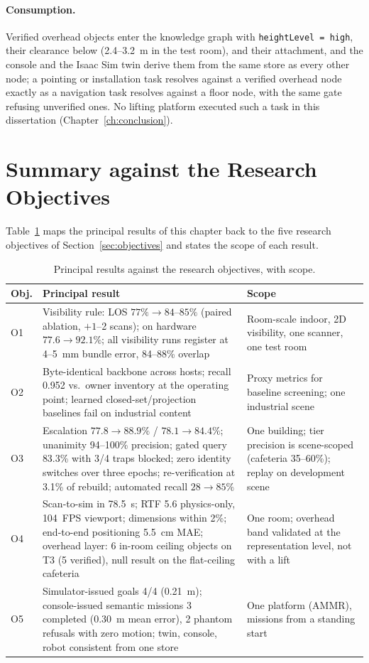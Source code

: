 \paragraph{Consumption.}
Verified overhead objects enter the knowledge graph with
\texttt{heightLevel = high}, their clearance below (2.4--3.2~m in the test
room), and their attachment, and the console and the Isaac Sim twin derive
them from the same store as every other node; a pointing or installation
task resolves against a verified overhead node exactly as a navigation task
resolves against a floor node, with the same gate refusing unverified ones.
No lifting platform executed such a task in this dissertation
(Chapter~\ref{ch:conclusion}).

\section{Summary against the Research Objectives}
\label{sec:exp-summary}

Table~\ref{tab:objsummary} maps the principal results of this chapter back to
the five research objectives of Section~\ref{sec:objectives} and states the
scope of each result.

\begin{table}[htbp]
\centering
\caption{Principal results against the research objectives, with scope.}
\label{tab:objsummary}
\small
\begin{tabularx}{\textwidth}{l X X}
\toprule
\textbf{Obj.} & \textbf{Principal result} & \textbf{Scope} \\
\midrule
O1 & Visibility rule: LOS $77\%\to84$--$85\%$ (paired ablation, $+1$--2 scans); on hardware $77.6\to92.1\%$; all visibility runs register at 4--5~mm bundle error, 84--88\% overlap & Room-scale indoor, 2D visibility, one scanner, one test room \\
O2 & Byte-identical backbone across hosts; recall 0.952 vs.\ owner inventory at the operating point; learned closed-set/projection baselines fail on industrial content & Proxy metrics for baseline screening; one industrial scene \\
O3 & Escalation $77.8\to88.9\%$ / $78.1\to84.4\%$; unanimity 94--100\% precision; gated query 83.3\% with 3/4 traps blocked; zero identity switches over three epochs; re-verification at 3.1\% of rebuild; automated recall $28\to85\%$ & One building; tier precision is scene-scoped (cafeteria 35--60\%); replay on development scene \\
O4 & Scan-to-sim in 78.5~s; RTF 5.6 physics-only, 104~FPS viewport; dimensions within 2\%; end-to-end positioning 5.5~cm MAE; overhead layer: 6 in-room ceiling objects on T3 (5 verified), null result on the flat-ceiling cafeteria & One room; overhead band validated at the representation level, not with a lift \\
O5 & Simulator-issued goals 4/4 (0.21~m); console-issued semantic missions 3 completed (0.30~m mean error), 2 phantom refusals with zero motion; twin, console, robot consistent from one store & One platform (AMMR), missions from a standing start \\
\bottomrule
\end{tabularx}
\end{table}

